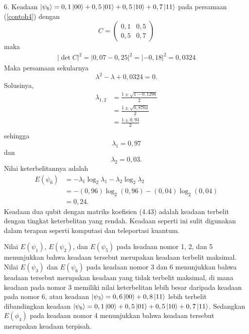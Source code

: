 6. Keadaan $\ket{\psi_6}=0,1\ket{00}+0,5\ket{01}+0,5\ket{10}+0,7\ket{11}$ pada persamaan (\ref{contoh4}) dengan
\begin{equation}
	C=
	\begin{pmatrix}
		0,1&0,5\\
		0,5&0,7
	\end{pmatrix}
\end{equation}
maka
\begin{equation}
	\begin{aligned}
		|\det C|^2=|0,07-0,25|^2=|-0,18|^2=0,0324
	\end{aligned}
\end{equation}
Maka persamaan sekularnya
\begin{equation}
	\lambda^2-\lambda+0,0324=0.
\end{equation}
Solusinya,
\begin{equation}
	\begin{aligned}
		\lambda_{1,2}
		&=\frac{1\pm\sqrt{1-0,1296}}{2}\\
		&=\frac{1\pm\sqrt{0,8704}}{2}\\
		&=\frac{1\pm 0,93}{2}\\
	\end{aligned}
\end{equation}
sehingga
\begin{equation}
	\lambda_1=0,97
\end{equation}
dan
\begin{equation}
	\lambda_2=0,03.
\end{equation}
Nilai keterbelitannya adalah
\begin{equation}
	\begin{aligned}
		E(\psi_6)
		&=-\lambda_1\log_2\lambda_1-\lambda_2\log_2\lambda_2\\
		&=-(0,96)\log_2(0,96)-(0,04)\log_2(0,04)\\
		&=0,24.
	\end{aligned}
\end{equation}
Keadaan dua qubit dengan matriks koefisien (4.43) adalah keadaan terbelit dengan tingkat keterbelitan yang rendah. Keadaan seperti ini sulit digunakan dalam terapan seperti komputasi dan teleportasi kuantum.
\par
Nilai $E(\psi_1)$, $E(\psi_2)$, dan $E(\psi_5)$ pada keadaan nomor 1, 2, dan 5 menunjukkan bahwa keadaan tersebut merupakan keadaan terbelit maksimal. Nilai $E(\psi_3)$ dan $E(\psi_6)$ pada keadaan nomor 3 dan 6 menunjukkan bahwa keadaan tersebut merupakan keadaan yang tidak terbelit maksimal, di mana keadaan pada nomor 3 memiliki nilai keterbelitan lebih besar daripada keadaan pada nomor 6, atau keadaan $\ket{\psi_3}=0,6\ket{00}+0,8\ket{11}$ lebih terbelit dibandingkan keadaan $\ket{\psi_6}=0,1\ket{00}+0,5\ket{01}+0,5\ket{10}+0,7\ket{11}$. Sedangkan $E(\phi_4)$ pada keadaan nomor 4 menunjukkan bahwa keadaan tersebut merupakan keadaan terpisah.

